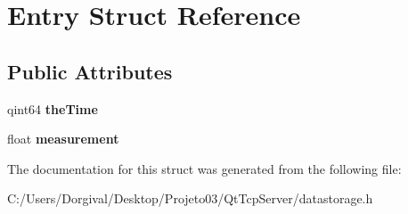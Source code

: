 \section{Entry Struct Reference}
\label{struct_entry}
\subsection*{Public Attributes}
\begin{DoxyCompactItemize}
\item 
\mbox{\label{struct_entry_a0a78d616ccc342ef6c34d849288d7c85}} 
qint64 {\bfseries the\+Time}
\item 
\mbox{\label{struct_entry_a78ebc6241b1baaa2551b2cf89f519960}} 
float {\bfseries measurement}
\end{DoxyCompactItemize}


The documentation for this struct was generated from the following file\+:\begin{DoxyCompactItemize}
\item 
C\+:/\+Users/\+Dorgival/\+Desktop/\+Projeto03/\+Qt\+Tcp\+Server/datastorage.\+h\end{DoxyCompactItemize}
